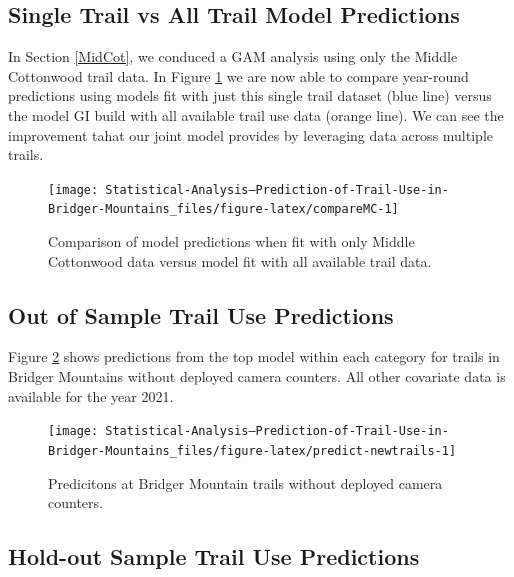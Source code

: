 \documentclass[
]{book}
\begin{document}
\hypertarget{single-trail-vs-all-trail-model-predictions}{%
\subsection{Single Trail vs All Trail Model Predictions}\label{single-trail-vs-all-trail-model-predictions}}

In Section \ref{MidCot}, we conduced a GAM analysis using only the Middle Cottonwood trail data. In Figure \ref{fig:compareMC} we are now able to compare year-round predictions using models fit with just this single trail dataset (blue line) versus the model GI build with all available trail use data (orange line). We can see the improvement tahat our joint model provides by leveraging data across multiple trails.

\begin{figure}

{\centering \texttt{[image: Statistical-Analysis--Prediction-of-Trail-Use-in-Bridger-Mountains\_files/figure-latex/compareMC-1]} 

}

\caption{Comparison of model predictions when fit with only Middle Cottonwood data versus model fit with all available trail data.}\label{fig:compareMC}
\end{figure}

\hypertarget{out-of-sample-trail-use-predictions}{%
\subsection{Out of Sample Trail Use Predictions}\label{out-of-sample-trail-use-predictions}}

Figure \ref{fig:predict-newtrails} shows predictions from the top model within each category for trails in Bridger Mountains without deployed camera counters. All other covariate data is available for the year 2021.

\begin{figure}

{\centering \texttt{[image: Statistical-Analysis--Prediction-of-Trail-Use-in-Bridger-Mountains\_files/figure-latex/predict-newtrails-1]} 

}

\caption{Predicitons at Bridger Mountain trails without deployed camera counters.}\label{fig:predict-newtrails}
\end{figure}

\hypertarget{hold-out-sample-trail-use-predictions}{%
\subsection{Hold-out Sample Trail Use Predictions}\label{hold-out-sample-trail-use-predictions}}
\end{document}
